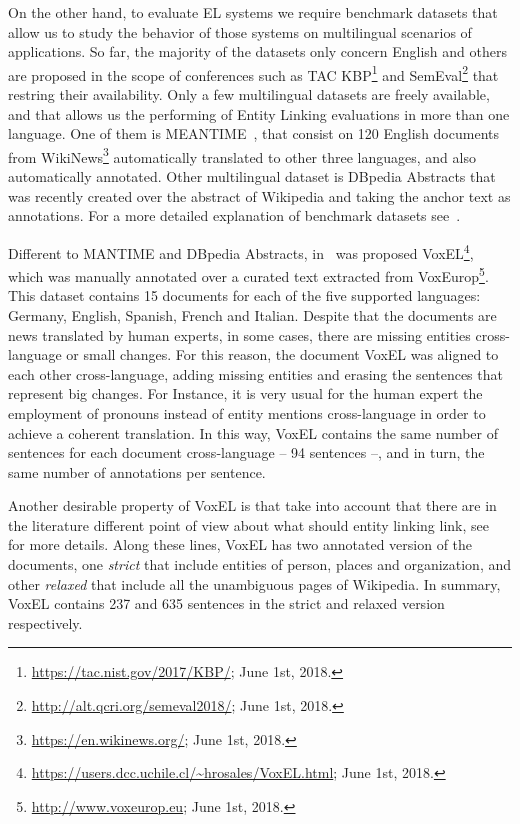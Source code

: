 \documentclass{llncs}
\begin{document}
On the other hand, to evaluate EL systems we require benchmark datasets that allow us to study the behavior of those systems on multilingual scenarios of applications. So far, the majority of the datasets only concern English and others are proposed in the scope of conferences such as TAC KBP\footnote{\url{https://tac.nist.gov/2017/KBP/}; June 1st, 2018.} and SemEval\footnote{\url{http://alt.qcri.org/semeval2018/}; June 1st, 2018.} that restring their availability. Only a few multilingual datasets are freely available, and that allows us the performing of Entity Linking evaluations in more than one language. One of them is MEANTIME~\cite{meantime16}, that consist on 120 English documents from WikiNews\footnote{\url{https://en.wikinews.org/}; June 1st, 2018.} automatically translated to other three languages, and also automatically annotated. Other multilingual dataset is DBpedia Abstracts that was recently created over the abstract of Wikipedia and taking the anchor text as annotations. For a more detailed explanation of benchmark datasets see~\cite{ourISWC}.

Different to MANTIME and DBpedia Abstracts, in~\cite{ourISWC} was proposed VoxEL\footnote{\url{https://users.dcc.uchile.cl/\~hrosales/VoxEL.html}; June 1st, 2018.}, which was manually annotated over a curated text extracted from VoxEurop\footnote{\url{http://www.voxeurop.eu}; June 1st, 2018.}. This dataset contains 15 documents for each of the five supported languages: Germany, English, Spanish, French and Italian. Despite that the documents are news translated by human experts, in some cases, there are missing entities cross-language or small changes. For this reason, the document VoxEL was aligned to each other cross-language, adding missing entities and erasing the sentences that represent big changes. For Instance, it is very usual for the human expert the employment of pronouns instead of entity mentions cross-language in order to achieve a coherent translation. In this way, VoxEL contains the same number of sentences for each document cross-language -- 94 sentences --, and in turn, the same number of annotations per sentence. 

Another desirable property of VoxEL is that take into account that there are in the literature different point of view about what should entity linking link, see~\cite{ourAMW2018} for more details. Along these lines, VoxEL has two annotated version of the documents, one \textit{strict} that include entities of person, places and organization, and other \textit{relaxed} that include all the unambiguous pages of Wikipedia. In summary, VoxEL contains 237 and 635 sentences in the strict and relaxed version respectively.
\end{document}
